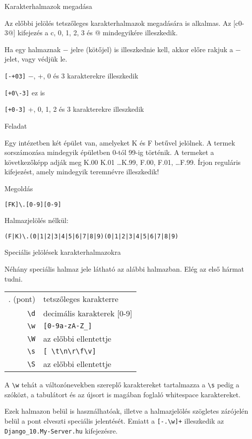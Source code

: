 \documentclass[
    ignorenonframetext
    ]{beamer}
\begin{document}
\begin{frame}[fragile]
    {Karakterhalmazok megadása}

    Az előbbi jelölés tetszőleges karakterhalmazok megadására is alkalmas.
    Az [c0-3@] kifejezés a c, 0, 1, 2, 3 és @ mindegyikére illeszkedik.

    Ha egy halmaznak $-$ jelre (kötőjel) is illeszkednie kell, akkor
    előre rakjuk a $-$ jelet, vagy védjük le.

    \verb![-+03]! \qquad $-$, +, 0 és 3 karakterekre illeszkedik

    \verb![+0\-3]! \qquad ez is

    \verb![+0-3]! \qquad +, 0, 1, 2 és 3 karakterekre illeszkedik
\end{frame}

\begin{frame}[fragile]
    {Feladat}

    Egy intézetben két épület van, amelyeket K és F betűvel jelölnek. A
    termek sorszámozása mindegyik épületben 0-tól 99-ig történik. A
    termeket a következőképp adják meg K.00 K.01 \ldots K.99, F.00,
    F.01, \ldots F.99. Írjon reguláris kifejezést, amely mindegyik
    teremnévre illeszkedik!

    \megoldasjon
\end{frame}

\begin{frame}[fragile]
    {Megoldás}

    \verb![FK]\.[0-9][0-9]!

    Halmazjelölés nélkül:

    \verb!(F|K)\.(0|1|2|3|4|5|6|7|8|9)(0|1|2|3|4|5|6|7|8|9)!
\end{frame}

\begin{frame}[fragile]
    {Speciális jelölések karakterhalmazokra}

    Néhány speciális halmaz jele látható az alábbi halmazban. Elég az
    első hármat tudni.

    \vfill
    \begin{tabular}{rl}
        . (pont)  & tetszőleges karakterre\\
        \verb"\d" & decimális karakterek [0-9]\\
        \verb"\w" & \verb"[0-9a-zA-Z_]"\\
        \verb"\W" & az előbbi ellentettje\\
        \verb"\s" & \verb"[ \t\n\r\f\v]"\\
        \verb"\S" & az előbbi ellentettje\\
    \end{tabular}

    \vfill
    A \verb"\w" tehát a változónevekben szereplő karaktereket
    tartalmazza a \verb"\s" pedig a szóközt, a tabulátort és az újsort
    is magában foglaló whitespace karaktereket.

    \vfill
    Ezek halmazon belül is használhatóak, illetve a halmazjelölés
    szögletes zárójelén belül a pont elveszti speciális jelentését.
    Emiatt a \verb"[-.\w]+" illeszkedik az
    \verb"Django_10.My-Server.hu" kifejezésre.
\end{frame}
\end{document}
